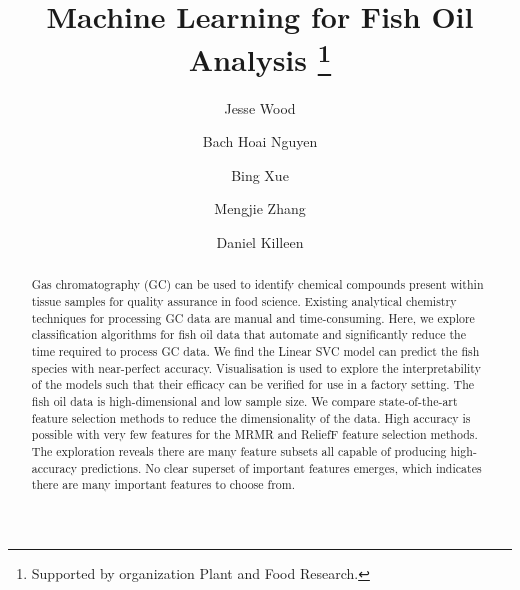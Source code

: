 \documentclass[runningheads]{llncs}
\begin{document}
%
\title{Machine Learning for Fish Oil Analysis \thanks{Supported by organization Plant and Food Research.}}
%
%
\author{Jesse Wood \and
Bach Hoai Nguyen \and
Bing Xue \and 
Mengjie Zhang \and 
Daniel Killeen
} 
%
%

%
\maketitle              %
%
\begin{abstract}

Gas chromatography (GC) can be used to identify chemical compounds present within tissue samples for quality assurance in food science.
Existing analytical chemistry techniques for processing GC data are manual and time-consuming.
Here, we explore classification algorithms for fish oil data that automate and significantly reduce the time required to process GC data.
We find the Linear SVC model can predict the fish species with near-perfect accuracy.
Visualisation is used to explore the interpretability of the models such that their efficacy can be verified for use in a factory setting.
The fish oil data is high-dimensional and low sample size.
We compare state-of-the-art feature selection methods to reduce the dimensionality of the data.
High accuracy is possible with very few features for the MRMR and ReliefF feature selection methods.
The exploration reveals there are many feature subsets all capable of producing high-accuracy predictions.
No clear superset of important features emerges, which indicates there are many important features to choose from.

\end{abstract}
%
%
%
\end{document}
